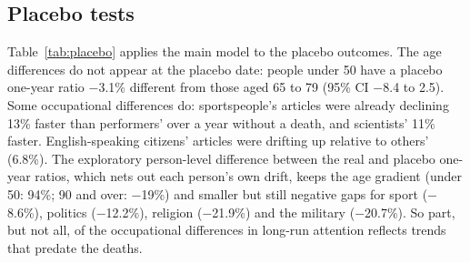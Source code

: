 \documentclass[11pt,a4paper]{article}
\begin{document}
\subsection{Placebo tests}
Table~\ref{tab:placebo} applies the main model to the placebo outcomes. The age differences do not appear at the placebo date: people under 50 have a placebo one-year ratio $-$3.1\% different from those aged 65 to 79 (95\% CI $-$8.4 to 2.5). Some occupational differences do: sportspeople's articles were already declining 13\% faster than performers' over a year without a death, and scientists' 11\% faster. English-speaking citizens' articles were drifting up relative to others' (6.8\%). The exploratory person-level difference between the real and placebo one-year ratios, which nets out each person's own drift, keeps the age gradient (under 50: 94\%; 90 and over: $-$19\%) and smaller but still negative gaps for sport ($-$8.6\%), politics ($-$12.2\%), religion ($-$21.9\%) and the military ($-$20.7\%). So part, but not all, of the occupational differences in long-run attention reflects trends that predate the deaths.

\begin{table}[tbp]\centering\scriptsize\caption{Placebo regressions (same model, same people): placebo peak and one-year ratio at a fake date 24 months before death; the real one-year ratio for the same people; and (exploratory) the person-level difference between real and placebo log one-year ratios. Percentage differences with 95\% intervals.}\label{tab:placebo}\setlength{\tabcolsep}{1.8pt}\end{table}
\end{document}
